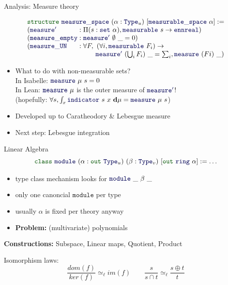 \documentclass{beamer}
\newcommand{\kw}[1]{{\color{green!33!black}\ensuremath{\mathtt{#1}}}}
\newcommand{\ident}[1]{{\color{blue!33!black}\ensuremath{\mathtt{#1}}}}
\begin{document}
\begin{frame}{Analysis: Measure theory}

  \[ \begin{array}{l@{\;}c@{\;}l}
    \multicolumn{3}{l}{
    \kw{structure}~\ident{measure\_space}~(\alpha : \ident{Type}_u)~[\ident{measurable\_space}~\alpha] :=} \\
    (\ident{measure'} & : & \Pi (s : \ident{set}~\alpha), \ident{measurable}~s \to \ident{ennreal}) \\
    (\ident{measure\_empty} & : & \ident{measure'}~\emptyset~\_ = 0)\\
    (\ident{measure\_UN} & : & \forall F,~(\forall i, \ident{measurable}~F_i) \to \\
      & & \hphantom{\forall F,~} \ident{measure'}~(\bigcup_i F_i)~\_ = \sum_i, \ident{measure}~(F i)~\_)
  \end{array} \]

  \begin{itemize}[<+->]
    \item What to do with non-measurable sets? \\
      In Isabelle: $\ident{measure}~\mu~s = 0$ \\
      In Lean: $\ident{measure}~\mu$ is the outer measure of $\ident{measure'}$! \\
      (hopefully: $\forall s, \int_x \ident{indicator}~s~x~\mathbf{d}\mu = \ident{measure}~\mu~s$)
    \item Developed up to Caratheodory \& Lebesgue measure
    \item Next step: Lebesgue integration
  \end{itemize}
\end{frame}

\begin{frame}{Linear Algebra}
  \[ \kw{class}~\ident{module}~(\alpha : \kw{out}~\ident{Type}_u)~(\beta : \ident{Type}_v)~[\kw{out}~\ident{ring}~\alpha] := \ldots \]
  \pause
  \begin{itemize}
    \item type class mechanism looks for $\ident{module}~\_~\beta~\_$
    \pause
    \item only one canoncial \ident{module} per type
    \pause
    \item usually $\alpha$ is fixed per theory anyway
    \pause
    \item \textbf{Problem:} (multivariate) polynomials
  \end{itemize}
  \pause
  \vspace{1em}
  \textbf{Constructions:} Subspace, Linear maps, Quotient, Product

  \pause
  \begin{example}{Isomorphism laws:}
  \[
    \frac{dom(f)}{ker(f)} \simeq_{\ell} im(f) \qquad
    \frac{s}{s \cap t} \simeq_{\ell} \frac{s \oplus t}{t}
  \]
  \end{example}

\end{frame}
\end{document}
